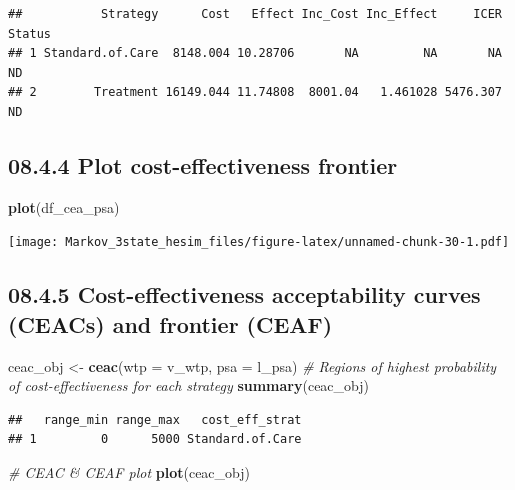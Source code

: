 \documentclass[
]{article}
\newenvironment{Shaded}{\begin{snugshade}}{\end{snugshade}}
\newcommand{\CommentTok}[1]{\textcolor[rgb]{0.56,0.35,0.01}{\textit{#1}}}
\newcommand{\DataTypeTok}[1]{\textcolor[rgb]{0.13,0.29,0.53}{#1}}
\newcommand{\KeywordTok}[1]{\textcolor[rgb]{0.13,0.29,0.53}{\textbf{#1}}}
\newcommand{\NormalTok}[1]{#1}
\newcommand{\StringTok}[1]{\textcolor[rgb]{0.31,0.60,0.02}{#1}}
\begin{document}
\begin{verbatim}
##           Strategy      Cost   Effect Inc_Cost Inc_Effect     ICER Status
## 1 Standard.of.Care  8148.004 10.28706       NA         NA       NA     ND
## 2        Treatment 16149.044 11.74808  8001.04   1.461028 5476.307     ND
\end{verbatim}

\hypertarget{plot-cost-effectiveness-frontier}{%
\subsection{08.4.4 Plot cost-effectiveness
frontier}\label{plot-cost-effectiveness-frontier}}

\begin{Shaded}
\begin{Highlighting}[]
\KeywordTok{plot}\NormalTok{(df_cea_psa)}
\end{Highlighting}
\end{Shaded}

\texttt{[image: Markov\_3state\_hesim\_files/figure-latex/unnamed-chunk-30-1.pdf]}

\hypertarget{cost-effectiveness-acceptability-curves-ceacs-and-frontier-ceaf}{%
\subsection{08.4.5 Cost-effectiveness acceptability curves (CEACs) and
frontier
(CEAF)}\label{cost-effectiveness-acceptability-curves-ceacs-and-frontier-ceaf}}

\begin{Shaded}
\begin{Highlighting}[]
\NormalTok{ceac_obj <-}\StringTok{ }\KeywordTok{ceac}\NormalTok{(}\DataTypeTok{wtp =}\NormalTok{ v_wtp, }\DataTypeTok{psa =}\NormalTok{ l_psa)}
\CommentTok{# Regions of highest probability of cost-effectiveness for each strategy}
\KeywordTok{summary}\NormalTok{(ceac_obj)}
\end{Highlighting}
\end{Shaded}

\begin{verbatim}
##   range_min range_max   cost_eff_strat
## 1         0      5000 Standard.of.Care
\end{verbatim}

\begin{Shaded}
\begin{Highlighting}[]
\CommentTok{# CEAC & CEAF plot}
\KeywordTok{plot}\NormalTok{(ceac_obj)}
\end{Highlighting}
\end{Shaded}
\end{document}

